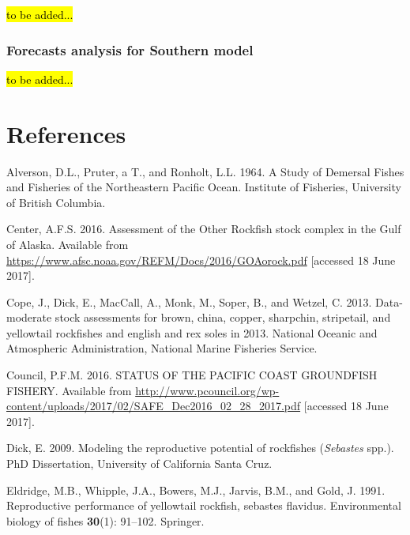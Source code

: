 \documentclass[12pt,]{article}
\begin{document}
\hl{to be added...}

\subsubsection{Forecasts analysis for Southern
model}\label{forecasts-analysis-for-southern-model}

\hl{to be added...}

\FloatBarrier

\newpage

\color{black}

\section*{References}\label{references}

\renewcommand{\thepage}{}




\newpage

\hypertarget{refs}{}
\hypertarget{ref-Alverson1964}{}
Alverson, D.L., Pruter, a T., and Ronholt, L.L. 1964. A Study of
Demersal Fishes and Fisheries of the Northeastern Pacific Ocean.
Institute of Fisheries, University of British Columbia.

\hypertarget{ref-AFSC2016}{}
Center, A.F.S. 2016. Assessment of the Other Rockfish stock complex in
the Gulf of Alaska. Available from
\url{https://www.afsc.noaa.gov/REFM/Docs/2016/GOAorock.pdf} {[}accessed
18 June 2017{]}.

\hypertarget{ref-Cope2013}{}
Cope, J., Dick, E., MacCall, A., Monk, M., Soper, B., and Wetzel, C.
2013. Data-moderate stock assessments for brown, china, copper,
sharpchin, stripetail, and yellowtail rockfishes and english and rex
soles in 2013. National Oceanic and Atmospheric Administration, National
Marine Fisheries Service.

\hypertarget{ref-PFMC2016}{}
Council, P.F.M. 2016. STATUS OF THE PACIFIC COAST GROUNDFISH FISHERY.
Available from
\url{http://www.pcouncil.org/wp-content/uploads/2017/02/SAFE_Dec2016_02_28_2017.pdf}
{[}accessed 18 June 2017{]}.

\hypertarget{ref-Dick2009}{}
Dick, E. 2009. Modeling the reproductive potential of rockfishes
(\emph{Sebastes} spp.). PhD Dissertation, University of California Santa
Cruz.

\hypertarget{ref-Eldridge1991}{}
Eldridge, M.B., Whipple, J.A., Bowers, M.J., Jarvis, B.M., and Gold, J.
1991. Reproductive performance of yellowtail rockfish, sebastes
flavidus. Environmental biology of fishes \textbf{30}(1): 91--102.
Springer.
\end{document}
